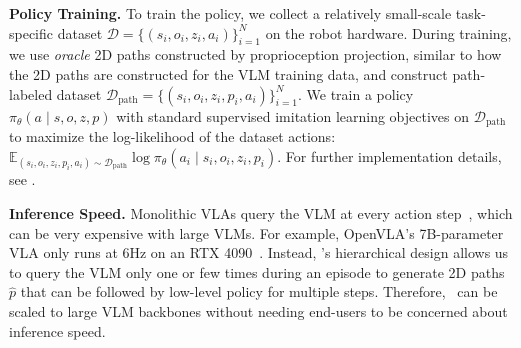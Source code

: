 \textbf{Policy Training.} 
To train the policy, we collect a relatively small-scale task-specific dataset $\mathcal{D}=\{(s_i, o_i, z_i, a_i)\}_{i=1}^N$ on the robot hardware. 
During training, we use \emph{oracle} 2D paths constructed by proprioception projection, similar to how the 2D paths are constructed for the VLM training data, and construct path-labeled dataset $\mathcal{D}_\text{path}=\{(s_i, o_i, z_i, p_i, a_i)\}_{i=1}^N$. %
% 
% 
We train a policy $\pi_\theta(a \mid s, {o}, z, p)$ 
with standard supervised imitation learning objectives on $\mathcal{D}_\text{path}$
to maximize the log-likelihood of the dataset actions: $\mathbb{E}_{(s_i, o_i, z_i, p_i, a_i)\sim \mathcal{D}_\text{path}} \log \pi_\theta(a_i \mid s_i, o_i, z_i, p_i)$. 
For further implementation details, see .



\textbf{Inference Speed.}
Monolithic VLAs query the VLM at every action step~\citep{kim2024openvla, rt22023arxiv}, which can be very expensive with large VLMs. For example, OpenVLA's 7B-parameter VLA only runs at 6Hz on an RTX 4090~\citep{kim2024openvla}.
Instead, \method 's hierarchical design allows us to query the VLM only one or few times during an episode to generate 2D paths $\hat{p}$ that can be followed by low-level policy for multiple steps. %
Therefore, \method\ can be scaled to large VLM backbones without needing end-users to be concerned about inference speed.

